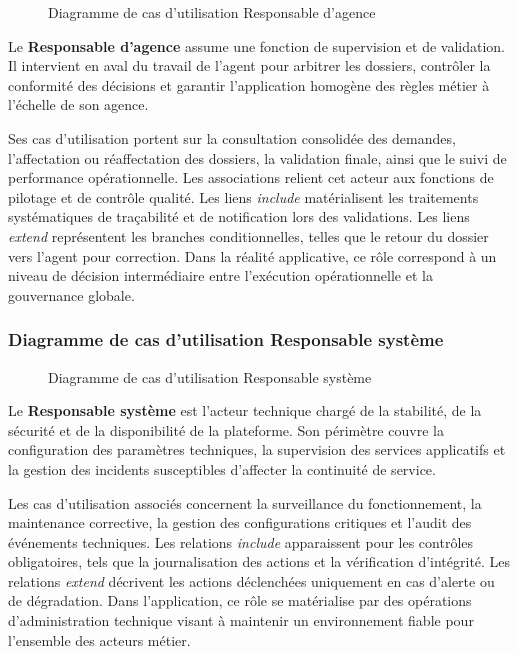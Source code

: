 \begin{figure}[H]
  \centering
  
  \caption{Diagramme de cas d'utilisation Responsable d'agence}
  \label{fig:dcu_responsable_agence}
\end{figure}

Le \textbf{Responsable d'agence} assume une fonction de supervision et de validation. Il intervient en aval du travail de l'agent pour arbitrer les dossiers, contrôler la conformité des décisions et garantir l'application homogène des règles métier à l'échelle de son agence.

Ses cas d'utilisation portent sur la consultation consolidée des demandes, l'affectation ou réaffectation des dossiers, la validation finale, ainsi que le suivi de performance opérationnelle. Les associations relient cet acteur aux fonctions de pilotage et de contrôle qualité. Les liens \emph{include} matérialisent les traitements systématiques de traçabilité et de notification lors des validations. Les liens \emph{extend} représentent les branches conditionnelles, telles que le retour du dossier vers l'agent pour correction. Dans la réalité applicative, ce rôle correspond à un niveau de décision intermédiaire entre l'exécution opérationnelle et la gouvernance globale.

\newpage
\subsubsection{Diagramme de cas d'utilisation Responsable système}

\begin{figure}[H]
  \centering
  
  \caption{Diagramme de cas d'utilisation Responsable système}
  \label{fig:dcu_responsable_systeme}
\end{figure}

Le \textbf{Responsable système} est l'acteur technique chargé de la stabilité, de la sécurité et de la disponibilité de la plateforme. Son périmètre couvre la configuration des paramètres techniques, la supervision des services applicatifs et la gestion des incidents susceptibles d'affecter la continuité de service.

Les cas d'utilisation associés concernent la surveillance du fonctionnement, la maintenance corrective, la gestion des configurations critiques et l'audit des événements techniques. Les relations \emph{include} apparaissent pour les contrôles obligatoires, tels que la journalisation des actions et la vérification d'intégrité. Les relations \emph{extend} décrivent les actions déclenchées uniquement en cas d'alerte ou de dégradation. Dans l'application, ce rôle se matérialise par des opérations d'administration technique visant à maintenir un environnement fiable pour l'ensemble des acteurs métier.

